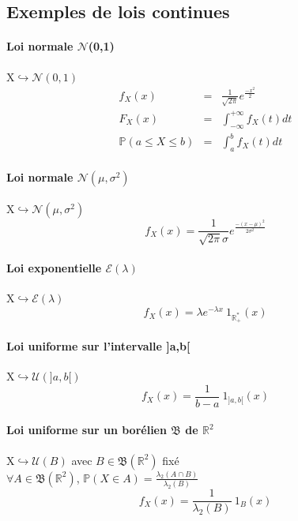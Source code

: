 \subsection*{Exemples de lois continues}
\paragraph{Loi normale $\mathcal{N}$(0,1)}
X$\hookrightarrow \mathcal{N}(0,1)$ \\
\begin{eqnarray*}
f_X(x)&=&\frac{1}{\sqrt{2\pi}} e^{\frac{-x^2}{2}} \\
F_X(x)&=&\int_{-\infty}^{+\infty} f_X(t)dt \\
\mathbb{P}(a \leq X \leq b) &=& \int_{a}^{b} f_X(t)dt
\end{eqnarray*}

\paragraph{Loi normale $\mathcal{N}(\mu,\sigma^2)$}
X$\hookrightarrow \mathcal{N}(\mu,\sigma^2)$ \\
\[f_X(x)=\frac{1}{\sqrt{2\pi}\sigma} e^{\frac{-(x-\mu)^2}{2\sigma^2}}\]

\paragraph{Loi exponentielle $\mathcal{E}(\lambda)$}
X$\hookrightarrow \mathcal{E}(\lambda)$ \\
\[f_X(x)=\lambda e^{-\lambda x}\ 1_{\mathbb{R}_+^*}(x)\]

\paragraph{Loi uniforme sur l'intervalle ]a,b[}
X$\hookrightarrow \mathcal{U}(]a,b[)$ \\
\[f_X(x)=\frac{1}{b-a} \ 1_{]a,b[}(x)\]

\paragraph{Loi uniforme sur un borélien $\mathfrak{B}$ de $\mathbb{R}^2$}
X$\hookrightarrow \mathcal{U}(B)$ avec $B \in \mathfrak{B}(\mathbb{R}^2)$ fixé\\
$\forall A \in \mathfrak{B}(\mathbb{R}^2)$, $\mathbb{P}(X\in A)=\frac{\lambda_2 (A \cap B)}{\lambda_2(B)}$
\[f_X(x)=\frac{1}{\lambda_2(B)} \ 1_{B}(x)\]

